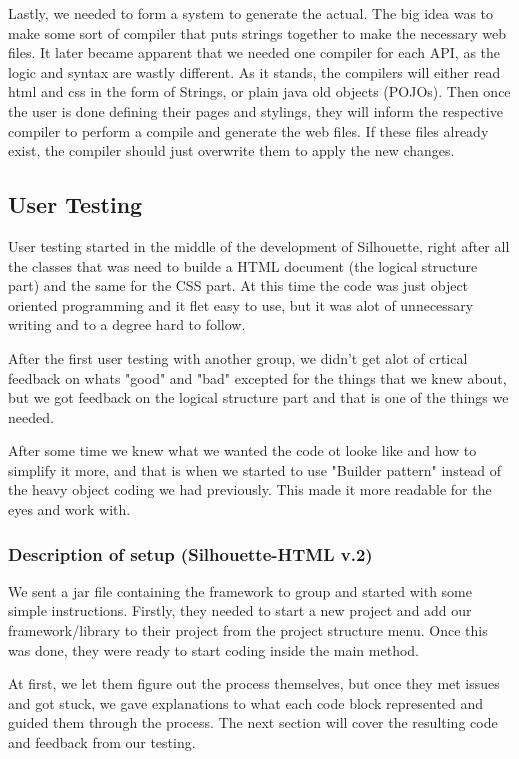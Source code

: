 \documentclass[12pt]{article}
\begin{document}
    Lastly, we needed to form a system to generate the actual. The big idea was to make some sort of compiler that puts strings together to make the necessary web files. It later became apparent that we needed one compiler for each API, as the logic and syntax are wastly different. As it stands, the compilers will either read html and css in the form of Strings, or plain java old objects (POJOs). Then once the user is done defining their pages and stylings, they will inform the respective compiler to perform a compile and generate the web files. If these files already exist, the compiler should just overwrite them to apply the new changes.


    \subsection{User Testing}
    User testing started in the middle of the development of Silhouette, right after all the classes that was need to builde a HTML document (the logical structure part) and the same for the CSS part. At this time the code was just object oriented programming and it flet easy to use, but it was alot of unnecessary writing and to a degree hard to follow.   
        
    After the first user testing with another group, we didn't get alot of crtical feedback on whats "good" and "bad" excepted for the things that we knew about, but we got feedback on the logical structure part and that is one of the things we needed.
        
    After some time we knew what we wanted the code ot looke like and how to simplify it more, and that is when we started to use "Builder pattern" instead of the heavy object coding we had previously. This made it more readable for the eyes and work with.

        \subsubsection{Description of setup (Silhouette-HTML v.2)}
        We sent a jar file containing the framework to group and started with some simple instructions. Firstly, they needed to start a new project and add our framework/library to their project from the project structure menu. Once this was done, they were ready to start coding inside the main method.
        
        At first, we let them figure out the process themselves, but once they met issues and got stuck, we gave explanations to what each code block represented and guided them through the process. The next section will cover the resulting code and feedback from our testing.
\end{document}
